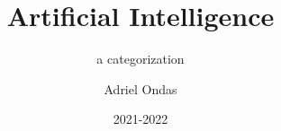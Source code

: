 \documentclass{vwa}
\title{Artificial Intelligence}
\subtitle{a categorization}
\author{Adriel Ondas}
\date{2021-2022} %
\begin{document}
\mymaketitle


\tableofcontents





\listoffigures


% 
\printbibliography

\appendix

% 
\end{document}
